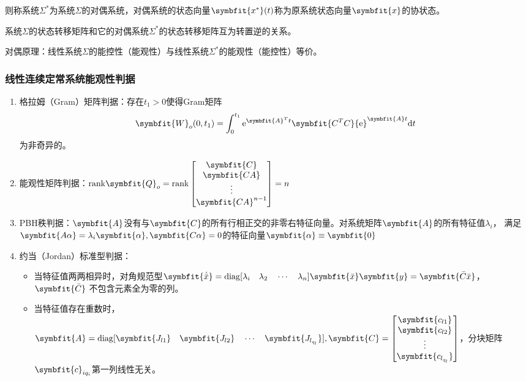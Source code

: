 \documentclass[11pt,a4paper]{ctexart}
\renewcommand{\d}{{\rm d}}
\newcommand{\e}{{\rm e}}
\newcommand{\bm}{\symbfit}
\begin{document}
            则称系统$\Sigma^*$为系统$\Sigma$的对偶系统，对偶系统的状态向量$\bm{x^*}(t)$称为原系统状态向量$\bm{x}$的协状态。

            系统$\Sigma$的状态转移矩阵和它的对偶系统$\Sigma^*$的状态转移矩阵互为转置逆的关系。

            对偶原理：线性系统$\Sigma$的能控性（能观性）与线性系统$\Sigma^*$的能观性（能控性）等价。

        \subsubsection{线性连续定常系统能观性判据}
        \begin{enumerate}
            \item 格拉姆（Gram）矩阵判据：存在$t_1>0$使得Gram矩阵
            \[
            \bm{W}_o(0,t_1)=\int_{0}^{t_1}\e^{\bm{A}^Tt}\bm{C^TC}\e^{\bm{A}t}\d t
            \]
            为非奇异的。

            \item 能观性矩阵判据：${\rm rank}\bm{Q}_o={\rm rank}\begin{bmatrix}\bm{C}\\ \bm{CA}\\ \vdots\\ \bm{CA}^{n-1}\end{bmatrix}=n$

            \item PBH秩判据：$\bm{A}$没有与$\bm{C}$的所有行相正交的非零右特征向量。对系统矩阵$\bm{A}$的所有特征值$\lambda_i$，
            满足$\bm{A\alpha}=\lambda_i\bm{\alpha},\bm{C\alpha}=0$的特征向量$\bm{\alpha}\equiv\bm{0}$

            \item 约当（Jordan）标准型判据：
            \begin{itemize}
                \item 当特征值两两相异时，对角规范型$\bm{\dot{\bar x}}={\rm diag}[\lambda_i\quad\lambda_2\quad\cdots\quad\lambda_n]\bm{\bar x}\bm{y}=\bm{\bar C\bar x}$，$\bm{\bar C}$
                不包含元素全为零的列。
                \item 当特征值存在重数时，$\bm{A}={\rm diag}[\bm{J_{l1}}\quad\bm{J_{l2}}\quad\cdots\quad\bm{J_{l_{q_l}}}],
                \bm{C}=\begin{bmatrix}\bm{c_{l1}}\\ \bm{c_{l2}}\\ \vdots\\ \bm{c_{l_{q_l}}}\end{bmatrix}$，分块矩阵$\bm{c}_{iq_i}$第一列线性无关。
            \end{itemize}               
        \end{enumerate}
            
\end{document}
